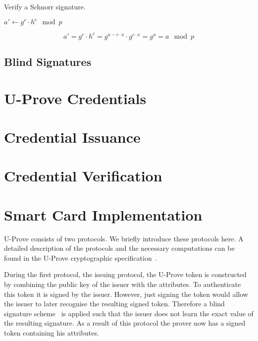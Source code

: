 \begin{algorithm}
  \caption{Verify a Schnorr signature.}
  \label{alg:Schnorr-verify}
  \addtolength{\baselineskip}{1mm}
  \begin{algorithmic}[1]
      \State $a' \gets g^r \cdot h^c \mod p$

        \Return {}
      \EndIf

      \Return {}
    \EndFunction
  \end{algorithmic}
\end{algorithm}

\begin{equation*}
  a' = g^r \cdot h^c = g^{u - c  \cdot x} \cdot g^{c \cdot x} = g^u = a \mod p
\end{equation*}

\subsection{Blind Signatures}
\cite{PointchevalStern1996}


\section{U-Prove Credentials}

\section{Credential Issuance}

\section{Credential Verification}

\section{Smart Card Implementation}

U-Prove consists of two protocols. We briefly introduce
these protocols here. A detailed description of the protocols and the necessary
computations can be found in the U-Prove cryptographic
specification~\cite{U-Prove_Crypto2010}.

During the first protocol, the issuing protocol, the U-Prove token is
constructed by combining the public key of the issuer with the attributes. To
authenticate this token it is signed by the issuer. However, just signing the
token would allow the issuer to later recognise the resulting signed token.
Therefore a blind signature scheme~\cite{Chaum1983} is applied such that the
issuer does not learn the exact value of the resulting signature. As a result of
this protocol the prover now has a signed token containing his attributes.

